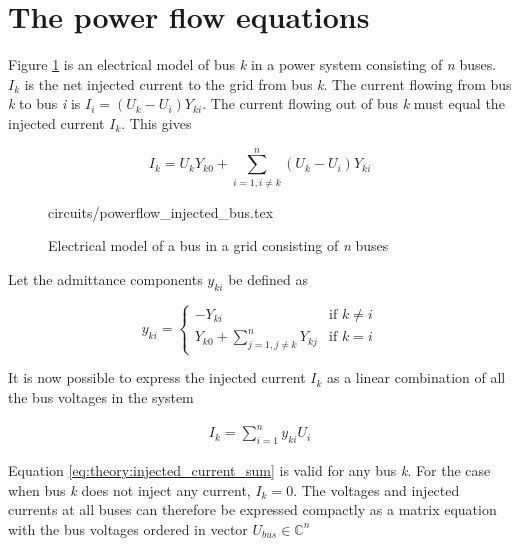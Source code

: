 \documentclass[class=book, crop=false]{standalone}
\begin{document}
\section{The power flow equations}
Figure \ref{fig:theory:powerflow_injected_bus} is an electrical model of bus \textit{k} in a power system consisting of \textit{n} buses. $I_{k}$ is the net injected current to the grid from bus \textit{k}\cite{opf_intro}. The current flowing from bus \textit{k} to bus \textit{i} is $I_{i} = (U_{k} - U_{i})Y_{ki}$. The current flowing out of bus \textit{k} must equal the injected current $I_{k}$. This gives

\begin{equation}\label{eq:powerflow_currentsum}
I_{k} =  U_{k}Y_{k0}
+ \sum_{i=1,i\neq k}^{n}(U_{k} - U_{i})Y_{ki}
\end{equation}



\begin{figure}[ht!]
    \center
    {circuits/powerflow_injected_bus.tex}
    \caption[size = 9]{Electrical model of a bus in a grid consisting of \textit{n} buses}
    \label{fig:theory:powerflow_injected_bus}
\end{figure}

Let the admittance components $y_{ki}$ be defined as


\begin{equation}
\label{eq:theory:admittance_components}
    y_{ki} =
\left\{
	\begin{array}{ll}
		     -Y_{ki}  & 
	    \mbox{if }
	        k \neq i
	           \\
		Y_{k0} + \sum_{j=1,j\neq k}^{n} Y_{kj} & \mbox{if } k=i
	\end{array}
\right.
\end{equation}


It is now possible to  express the injected current $I_{k}$ as a linear combination of all the bus voltages in the system 

\begin{equation}
    \begin{aligned}\label{eq:theory:injected_current_sum}
    I_{k} = \sum_{i=1}^{n} y_{ki}U_{i}
    \end{aligned} 
\end{equation}

Equation \eqref{eq:theory:injected_current_sum} is valid for any bus \textit{k}. For the case when bus \textit{k} does not inject any current, $I_{k} = 0$. The voltages and injected currents at all buses can therefore be expressed compactly as a matrix equation with the bus voltages ordered in vector $U_{bus}  \in{\boldsymbol{\mathbb{C}}^{n}}$
\end{document}
